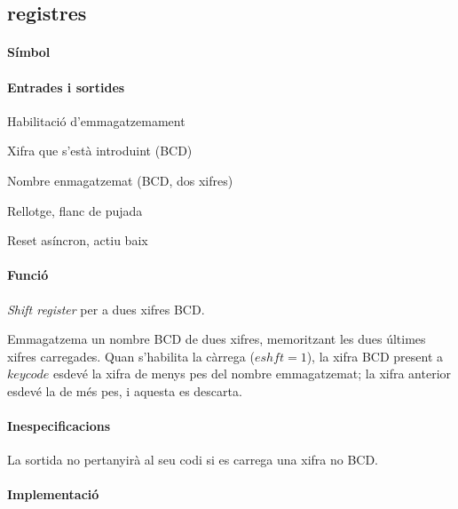 \subsection{\label{sub:\projectname-registres} \textsf{registres}}

\paragraph{Símbol}

\begin{center}  \end{center}

\paragraph{Entrades i sortides}

\begin{where}
\item[\nodenamebit{eshft}] Habilitació d'emmagatzemament
\item[\nodenamerange{keycode}{3}{0}] Xifra que s'està introduint (BCD)
\item[\nodenamerange{num}{7}{0}] Nombre enmagatzemat (BCD, dos xifres)
\item[\nodenamebit{clk}] Rellotge, flanc de pujada
\item[\nodenamebit{nrst}] Reset asíncron, actiu baix
\end{where}

\paragraph{Funció}

\emph{Shift register} per a dues xifres BCD.

Emmagatzema un nombre BCD de dues xifres, memoritzant les dues últimes
xifres carregades. Quan s'habilita la càrrega ($eshft = 1$), la xifra
BCD present a $keycode$ esdevé la xifra de menys pes del nombre
emmagatzemat; la xifra anterior esdevé la de més pes, i aquesta es descarta.

\paragraph{Inespecificacions}


La sortida no pertanyirà al seu codi si es carrega una xifra no BCD.


\paragraph{Implementació}

